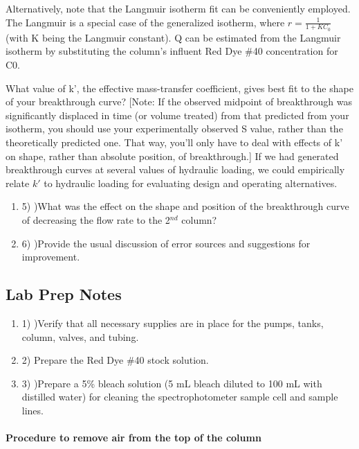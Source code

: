 \documentclass{article} %
\begin{document}
Alternatively, note that the Langmuir isotherm fit can be conveniently employed. The Langmuir is a special case of the generalized isotherm, where $r=\frac{1}{1+KC_{0} } $ (with K being the Langmuir constant). Q can be estimated from the Langmuir isotherm by substituting the column's influent Red Dye \#40 concentration for C0.

What value of k', the effective mass-transfer coefficient, gives best fit to the shape of your breakthrough curve? [Note: If the observed midpoint of breakthrough was significantly displaced in time (or volume treated) from that predicted from your isotherm, you should use your experimentally observed S value, rather than the theoretically predicted one. That way, you'll only have to deal with effects of k' on shape, rather than absolute position, of breakthrough.] If we had generated breakthrough curves at several values of hydraulic loading, we could empirically relate $k'$ to hydraulic loading for evaluating design and operating alternatives.

\noindent \begin{enumerate}
\item 5) )What was the effect on the shape and position of the breakthrough curve of decreasing the flow rate to the 2${}^{nd}$ column?

\noindent \item 6) )Provide the usual discussion of error sources and suggestions for improvement.
\end{enumerate}

\noindent 
\subsection{\eject Lab Prep Notes}

\noindent \begin{enumerate}
\item 1) )Verify that all necessary supplies are in place for the pumps, tanks, column, valves, and tubing. 

\noindent \item 2) Prepare the Red Dye \#40 stock solution.

\noindent \item 3) )Prepare a 5\% bleach solution (5 mL bleach diluted to 100 mL with distilled water) for cleaning the spectrophotometer sample cell and sample lines.
\end{enumerate}

\noindent 
\paragraph{Procedure to remove air from the top of the column }
\end{document}
